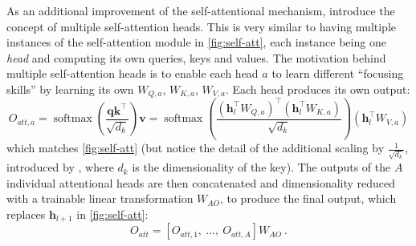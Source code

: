 \documentclass[bsc,frontabs,singlespacing,parskip,deptreport]{infthesis}
\DeclareMathOperator{\softmax}{softmax}
\begin{document}
{{{      %
      As an additional improvement of the self-attentional mechanism, \citeauthor{Vaswani_2017} introduce the concept of multiple self-attention heads. This is very similar to having multiple instances of the self-attention module in \autoref{fig:self-att}, each instance being one \textit{head} and computing its own queries, keys and values. The motivation behind multiple self-attention heads is to enable each head $a$ to learn different ``focusing skills'' by learning its own $W_{Q,a}$, $W_{K,a}$, $W_{V,a}$. Each head produces its own output:
      \begin{equation}
      O_{att,a} = \softmax(\frac{\bm{q}\bm{k}^\top}{\sqrt{d_k}})\bm{v} = \softmax(\frac{(\bm{h}_l^\top{W_{Q,a}})^\top(\bm{h}_l^\top{W_{K,a}})}{\sqrt{d_k}})(\bm{h}_l^\top{W_{V,a}})
      \end{equation}
      which matches \autoref{fig:self-att} (but notice the detail of the additional scaling by $\frac{1}{\sqrt{d_k}}$, introduced by \citeauthor{Vaswani_2017}, where $d_k$ is the dimensionality of the key).
      The outputs of the $A$ individual attentional heads are then concatenated and dimensionality reduced with a trainable linear transformation $W_{AO}$, to produce the final output, which replaces $\bm{h}_{l+1}$ in \autoref{fig:self-att}:
      \begin{equation}
      O_{att} = [O_{att, 1},\ \ldots,\ O_{att, A}]W_{AO}\ .
      \end{equation}
      
}}}
\end{document}
